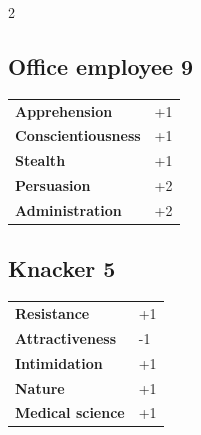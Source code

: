 \begin{multicols}{2}
\begin{tcolorbox}

\end{tcolorbox}

\begin{tcolorbox}
    \subsection*{Office employee \hfill \small{9 }}
    \tcblower




\begin{tabular}{@{}ll@{}}
    \textbf{Apprehension} & +1\\
    \textbf{Conscientiousness} & +1\\
    \textbf{Stealth} & +1\\
    \textbf{Persuasion} & +2\\
    \textbf{Administration} & +2\\
\end{tabular}


\end{tcolorbox}

\begin{tcolorbox}
    \subsection*{Knacker \hfill \small{5 }}
    \tcblower




\begin{tabular}{@{}ll@{}}
    \textbf{Resistance} & +1\\
    \textbf{Attractiveness} & -1\\
    \textbf{Intimidation} & +1\\
    \textbf{Nature} & +1\\
    \textbf{Medical science} & +1\\
\end{tabular}


\end{tcolorbox}
\end{multicols}
